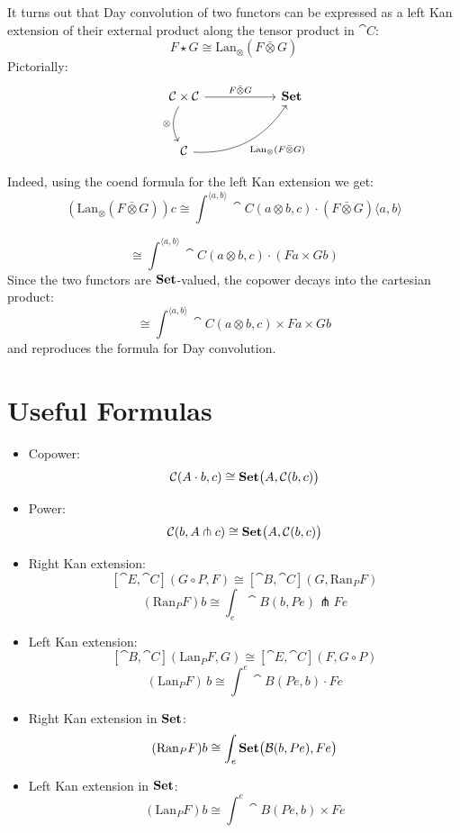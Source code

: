 \documentclass[DaoFP]{subfiles}
\begin{document}
It turns out that Day convolution of two functors can be expressed as a left Kan extension of their external product along the tensor product in $\cat C$:
\[ F \star G \cong \text{Lan}_{\otimes} (F \bar{ \otimes } G) \]
Pictorially:
\[
 \begin{tikzcd} [row sep=1cm, column sep=1cm]
 \cat C \times \cat C
 \arrow[rr, "F \bar{\otimes} G", "" {name=ID, below} ]
 \arrow[d, bend right, "\otimes"']
 && \Set
 \\
 \cat C
  \arrow[urr, bend right, "\text{Lan}_{\otimes} (F \bar{ \otimes } G)"']
 \end{tikzcd}
\]

Indeed, using the coend formula for the left Kan extension we get:
\[ (\text{Lan}_{\otimes} (F \bar{ \otimes } G)) c \cong \int^{\langle a, b\rangle} \cat C ( a \otimes b, c) \cdot (F \bar{ \otimes } G)\langle a, b\rangle\]

\[ \cong \int^{\langle a, b\rangle} \cat C ( a \otimes b, c) \cdot (F a \times G  b) \]
Since the two functors are $\mathbf{Set}$-valued, the copower decays into the cartesian product:
\[ \cong \int^{\langle a, b\rangle} \cat C ( a \otimes b, c) \times F a \times G  b \]
and reproduces the formula for Day convolution.

\section{Useful Formulas}
\begin{itemize}
\item Copower:
\[ \mathcal{C} (A \cdot b, c) \cong \mathbf{Set} \big( A, \mathcal{C} (b, c)\big) \]
\item Power:
\[ \mathcal{C} (b, A \pitchfork c) \cong \mathbf{Set}  \big(A, \mathcal{C}(b, c)\big) \]
\item Right Kan extension:
\[ [\cat E, \cat C](G \circ P, F) \cong [\cat B, \cat C](G, \text{Ran}_P F) \]
 \[ (\text{Ran}_P F) b \cong \int_e \cat B (b, P e) \pitchfork F e \]
\item Left Kan extension:
\[ [\cat B, \cat C](\text{Lan}_P F , G) \cong  [\cat E, \cat C] (F, G \circ P) \]
\[ (\text{Lan}_P F)\, b \cong \int^{e} \cat B(P e, b) \cdot F e \]
\item Right Kan extension in $\mathbf{Set}$:
  \[ (\text{Ran}_P F) b \cong \int_e \mathbf{Set} \big( \mathcal{B} (b, P e), F e\big) \]
\item Left Kan extension in $\mathbf{Set}$:
\[ (\text{Lan}_P F) b \cong \int^{e} \cat B (P e, b) \times F e \]


\end{itemize}
\end{document}
